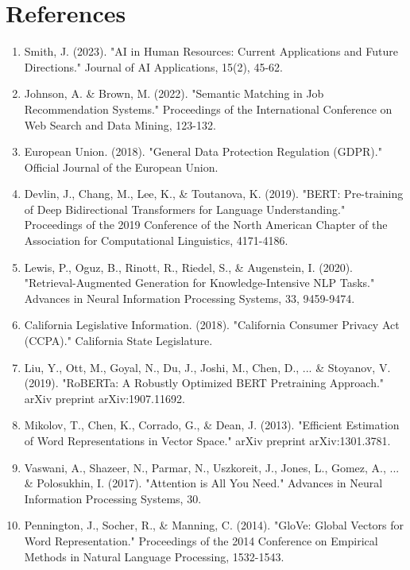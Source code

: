 \documentclass[12pt,a4paper]{report}
\begin{document}
\chapter{References}
\begin{enumerate}[leftmargin=2em]
  \item Smith, J. (2023). "AI in Human Resources: Current Applications and Future Directions." Journal of AI Applications, 15(2), 45-62.
  \item Johnson, A. \& Brown, M. (2022). "Semantic Matching in Job Recommendation Systems." Proceedings of the International Conference on Web Search and Data Mining, 123-132.
  \item European Union. (2018). "General Data Protection Regulation (GDPR)." Official Journal of the European Union.
  \item Devlin, J., Chang, M., Lee, K., \& Toutanova, K. (2019). "BERT: Pre-training of Deep Bidirectional Transformers for Language Understanding." Proceedings of the 2019 Conference of the North American Chapter of the Association for Computational Linguistics, 4171-4186.
  \item Lewis, P., Oguz, B., Rinott, R., Riedel, S., \& Augenstein, I. (2020). "Retrieval-Augmented Generation for Knowledge-Intensive NLP Tasks." Advances in Neural Information Processing Systems, 33, 9459-9474.
  \item California Legislative Information. (2018). "California Consumer Privacy Act (CCPA)." California State Legislature.
  \item Liu, Y., Ott, M., Goyal, N., Du, J., Joshi, M., Chen, D., ... \& Stoyanov, V. (2019). "RoBERTa: A Robustly Optimized BERT Pretraining Approach." arXiv preprint arXiv:1907.11692.
  \item Mikolov, T., Chen, K., Corrado, G., \& Dean, J. (2013). "Efficient Estimation of Word Representations in Vector Space." arXiv preprint arXiv:1301.3781.
  \item Vaswani, A., Shazeer, N., Parmar, N., Uszkoreit, J., Jones, L., Gomez, A., ... \& Polosukhin, I. (2017). "Attention is All You Need." Advances in Neural Information Processing Systems, 30.
  \item Pennington, J., Socher, R., \& Manning, C. (2014). "GloVe: Global Vectors for Word Representation." Proceedings of the 2014 Conference on Empirical Methods in Natural Language Processing, 1532-1543.
\end{enumerate}
\end{document}
